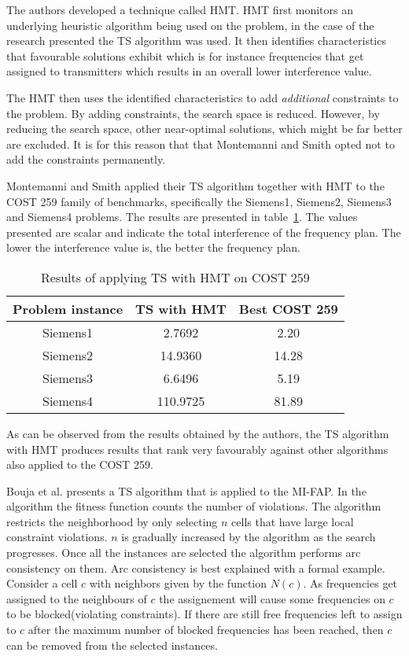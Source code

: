 The authors developed a technique called \gls{HMT}. \Gls{HMT} first monitors an underlying heuristic algorithm being used on the problem, in the case of the research presented the \gls{TS} algorithm was used\cite{TabuMontemanniSmith}. It then identifies characteristics that favourable solutions exhibit which is for instance frequencies that get assigned to transmitters which results in an overall lower interference value\cite{TabuMontemanniSmith}.

The \gls{HMT} then uses the identified characteristics to add \emph{additional} constraints to the problem\cite{TabuMontemanniSmith}. By adding constraints, the search space is reduced. However, by reducing the search space, other near-optimal solutions, which might be far better are excluded\cite{TabuMontemanniSmith}. It is for this reason that that Montemanni and Smith opted not to add the constraints permanently.

Montemanni and Smith applied their \gls{TS} algorithm together with \gls{HMT} to the \gls{COST} 259 family of benchmarks, specifically the Siemens1, Siemens2, Siemens3 and Siemens4 problems. The results are presented in table~\ref{TSCOST259}. The values presented are scalar and indicate the total interference of the frequency plan. The lower the interference value is, the better the frequency plan.
\begin{table}[H]
\centering
	\begin{tabular}{| c | c | c |}
		\hline
		Problem instance & \gls{TS} with HMT & Best COST 259 \\ \hline
		Siemens1 & 2.7692 & 2.20 \\ \hline
		Siemens2 & 14.9360 & 14.28 \\ \hline
		Siemens3 & 6.6496 & 5.19 \\ \hline
		Siemens4 & 110.9725 & 81.89 \\ \hline
	\end{tabular}
\caption{Results of applying \gls{TS} with HMT on COST 259}
\label{TSCOST259}
\end{table}
As can be observed from the results obtained by the authors, the \gls{TS} algorithm with HMT produces results that rank very favourably against other algorithms also applied to the \gls{COST} 259. 

Bouja et al. \cite{} presents a TS algorithm that is applied to the MI-FAP. In the algorithm the fitness function counts the number of violations. The algorithm restricts the neighborhood by only selecting $n$ cells that have large local constraint violations. $n$ is gradually increased by the algorithm as the search progresses. Once all the instances are selected the algorithm performs arc consistency on them. Arc consistency is best explained with a formal example. Consider a cell $c$ with neighbors given by the function $N(c)$. As frequencies get assigned to the neighbours of $c$ the assignement will cause some frequencies on $c$ to be blocked(violating constraints). If there are still free frequencies left to assign to $c$ after the maximum number of blocked frequencies has been reached, then $c$ can be removed from the selected instances.

